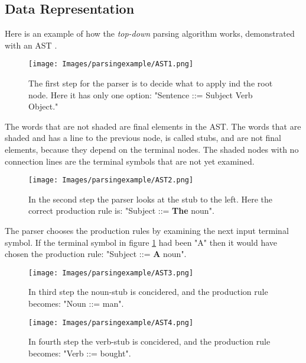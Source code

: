 \subsection{Data Representation}
\label{sec:asttheory}
Here is an example of how the \textit{top-down} parsing algorithm works, demonstrated with an AST \cite{misc:spo}.

\begin{figure}[H]
\begin{center}
\texttt{[image: Images/parsingexample/AST1.png]}
\end{center}
\caption{The first step for the parser is to decide what to apply ind the root node. Here it has only one option: "Sentence ::= Subject Verb Object."}
\end{figure}

The words that are not shaded are final elements in the AST. The words that are shaded and has a line to the previous node, is called stubs, and are not final elements, because they depend on the terminal nodes. The shaded nodes with no connection lines are the terminal symbols that are not yet examined.

\begin{figure}[H]
\begin{center}
\texttt{[image: Images/parsingexample/AST2.png]}
\end{center}
\caption{In the second step the parser looks at the stub to the left. Here the correct production rule is: "Subject ::= \textbf{The} noun".}
\label{fig:ast2}
\end{figure}

The parser chooses the production rules by examining the next input terminal symbol. If the terminal symbol in figure \ref{fig:ast2} had been "A" then it would have chosen the production rule: "Subject ::= \textbf{A} noun".

\begin{figure}[H]
\begin{center}
\texttt{[image: Images/parsingexample/AST3.png]}
\end{center}
\caption{In third step the noun-stub is concidered, and the production rule becomes: "Noun ::= man".}
\end{figure}

\begin{figure}[H]
\begin{center}
\texttt{[image: Images/parsingexample/AST4.png]}
\end{center}
\caption{In fourth step the verb-stub is concidered, and the production rule becomes: "Verb ::= bought".}
\end{figure}

